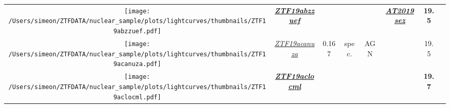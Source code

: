 \begin{table*}
{\begin{tabular}{c c  c  c  c   c  c  c}
      \parbox[c]{12em}{\texttt{[image: /Users/simeon/ZTFDATA/nuclear\_sample/plots/lightcurves/thumbnails/ZTF19abzzuef.pdf]}} & \textbf{\textit{\href{https://ztfnuclear.simeonreusch.com/transient/ZTF19abzzuef}{ZTF19abzzuef}}} & ~                        & ~                       & ~                 &
      \textbf{\textit{\href{https://www.wis-tns.org/object/2019sez}{AT2019sez}}}                                                                  & \textbf{19.5}                                                                                     &                                                                                                                                                 \\
      \parbox[c]{12em}{\texttt{[image: /Users/simeon/ZTFDATA/nuclear\_sample/plots/lightcurves/thumbnails/ZTF19acanuza.pdf]}} & \textit{\href{https://ztfnuclear.simeonreusch.com/transient/ZTF19acanuza}{ZTF19acanuza}}          & 0.167                    & spec.                   & AGN               & ~                          & 19.5           &                          \\
      \parbox[c]{12em}{\texttt{[image: /Users/simeon/ZTFDATA/nuclear\_sample/plots/lightcurves/thumbnails/ZTF19aclocml.pdf]}} & \textbf{\textit{\href{https://ztfnuclear.simeonreusch.com/transient/ZTF19aclocml}{ZTF19aclocml}}} & ~                        & ~                       & ~                 & ~                          & \textbf{19.7}  &                          \\
    \end{tabular}}
\end{table*}





